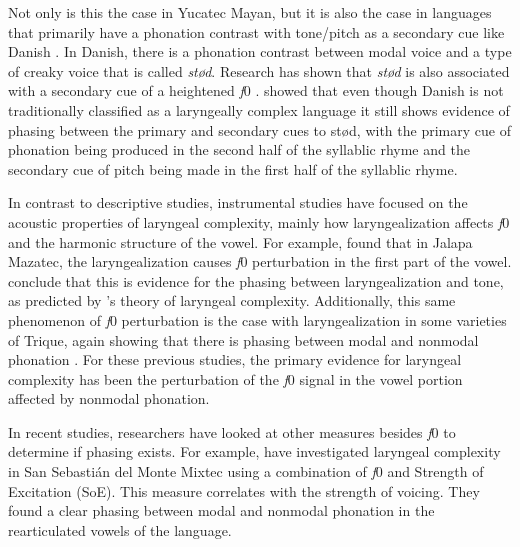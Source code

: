 Not only is this the case in Yucatec Mayan, but it is also the case in languages that primarily have a phonation contrast with tone/pitch as a secondary cue like Danish \citep{fischer-jorgensenPhoneticAnalysisStod1989,gronnumDanishStodLaryngealization2013,penaStodTimingDomain2022,penaProductionPerceptionStod2024}. In Danish, there is a phonation contrast between modal voice and a type of creaky voice that is called \textit{stød}. Research has shown that \textit{stød} is also associated with a secondary cue of a heightened \textit{f}0 \citep{fischer-jorgensenPhoneticAnalysisStod1989,gronnumDanishStodLaryngealization2013}. \citet{penaStodTimingDomain2022,penaProductionPerceptionStod2024} showed that even though Danish is not traditionally classified as a laryngeally complex language it still shows evidence of phasing between the primary and secondary cues to stød, with the primary cue of phonation being produced in the second half of the syllablic rhyme and the secondary cue of pitch being made in the first half of the syllablic rhyme.

In contrast to descriptive studies, instrumental studies have focused on the acoustic properties of laryngeal complexity, mainly how laryngealization affects \textit{f}0 and the harmonic structure of the vowel. For example, \citet{garellekAcousticConsequencesPhonation2011} found that in Jalapa Mazatec, the laryngealization causes \textit{f}0 perturbation in the first part of the vowel. \citeauthor{garellekAcousticConsequencesPhonation2011} conclude that this is evidence for the phasing between laryngealization and tone, as predicted by \citeauthor{silvermanLaryngealComplexityOtomanguean1997}'s \citeyear{silvermanLaryngealComplexityOtomanguean1997} theory of laryngeal complexity. Additionally, this same phenomenon of \textit{f}0 perturbation is the case with laryngealization in some varieties of Trique, again showing that there is phasing between modal and nonmodal phonation \citep{dicanioCoarticulationToneGlottal2012}. For these previous studies, the primary evidence for laryngeal complexity has been the perturbation of the \textit{f}0 signal in the vowel portion affected by nonmodal phonation.

In recent studies, researchers have looked at other measures besides \textit{f}0 to determine if phasing exists. For example, \citet{wellerInteractionsToneGlottalization2023,wellerLexicalToneVowel2023,wellerVoiceQualityTone2024} have investigated laryngeal complexity in San Sebastián del Monte Mixtec using a combination of \textit{f}0 and Strength of Excitation (SoE). This measure correlates with the strength of voicing. They found a clear phasing between modal and nonmodal phonation in the rearticulated vowels of the language. 

